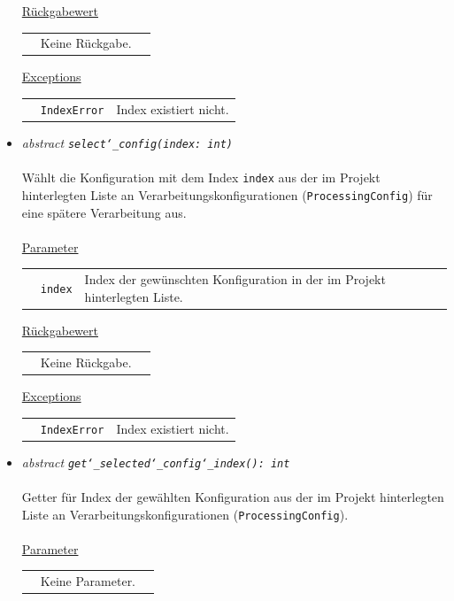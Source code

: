 \documentclass{article}
\begin{document}
\begin{itemize}
\underline{Rückgabewert}\\
\begin{tabular}{lll}
 & Keine Rückgabe.\\
\end{tabular}

\underline{Exceptions}\\
\begin{tabular}{lll}
 & \texttt{IndexError} & Index existiert nicht.\\
\end{tabular}

\item \textit{\flqq{}abstract\frqq} \texttt{\textit{select\char`_config(index: int)}}\\\\
Wählt die Konfiguration mit dem Index \texttt{index} aus der im Projekt hinterlegten Liste an Verarbeitungskonfigurationen (\texttt{ProcessingConfig}) für eine spätere Verarbeitung aus.
\\\\
\underline{Parameter}\\
\begin{tabular}{lll}
 & \texttt{index} & Index der gewünschten Konfiguration in der im Projekt hinterlegten Liste.
\end{tabular}

\underline{Rückgabewert}\\
\begin{tabular}{lll}
 & Keine Rückgabe.\\
\end{tabular}

\underline{Exceptions}\\
\begin{tabular}{lll}
 & \texttt{IndexError} & Index existiert nicht.\\
\end{tabular}


\item \textit{\flqq{}abstract\frqq} \texttt{\textit{get\char`_selected\char`_config\char`_index(): int}}\\\\
Getter für Index der gewählten Konfiguration aus der im Projekt hinterlegten Liste an Verarbeitungskonfigurationen (\texttt{ProcessingConfig}).
\\\\
\underline{Parameter}\\
\begin{tabular}{lll}
 & Keine Parameter.
\end{tabular}


\end{itemize}
\end{document}
